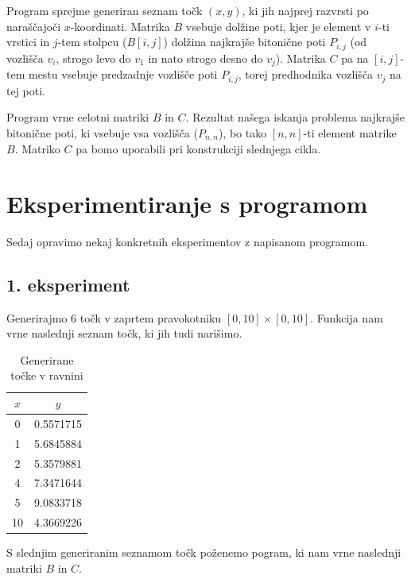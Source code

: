 \documentclass[12pt,a4paper]{amsart}
\theoremstyle{definition}
\theoremstyle{plain}
\begin{document}
\noindent
Program sprejme generiran seznam točk $(x,y)$, ki jih najprej razvrsti po naraščajoči $x$-koordinati. 
Matrika $B$ vsebuje dolžine poti, kjer je element v $i$-ti vrstici in $j$-tem stolpcu ($B[i,j]$) dolžina
najkrajše bitonične poti $P_{i,j}$ (od vozlišča $v_i$, strogo levo do $v_1$ in nato strogo desno do $v_j$).
Matrika $C$ pa na $[i,j]$-tem mestu vsebuje predzadnje vozlišče poti $P_{i,j}$, torej predhodnika vozlišča
$v_j$ na tej poti.
\newline

\noindent
Program vrne celotni matriki $B$ in $C$. Rezultat našega iskanja problema najkrajše bitonične poti, ki 
vsebuje vsa vozlišča ($P_{n,n}$), bo tako $[n,n]$-ti element matrike $B$. Matriko $C$ pa bomo uporabili pri
konstrukciji slednjega cikla.
\newline

\section{Eksperimentiranje s programom}

\noindent
Sedaj opravimo nekaj konkretnih eksperimentov z napisanom programom.
\newline

\subsection[]{1. eksperiment}
Generirajmo 6 točk v zaprtem pravokotniku $[0, 10] \times [0, 10].$ Funkcija nam vrne naslednji seznam točk,
ki jih tudi narišimo.

\begin{table}[h]
  \quad%
  \begin{tabular}{ |c| c| }
      \hline
   $x$ & $y$ \\ 
   \hline
   0 & 0.5571715 \\
   \hline  
   1 & 5.6845884 \\   
   \hline
   2 & 5.3579881 \\  
   \hline
   4 & 7.3471644 \\
   \hline
   5 & 9.0833718 \\  
   \hline
   10 & 4.3669226 \\  
   \hline 
  \end{tabular}
  \caption*{Generirane točke v ravnini}
\end{table}

\noindent
S slednjim generiranim seznamom točk poženemo pogram, ki nam vrne naslednji matriki $B$ in $C.$
\newline
\end{document}
